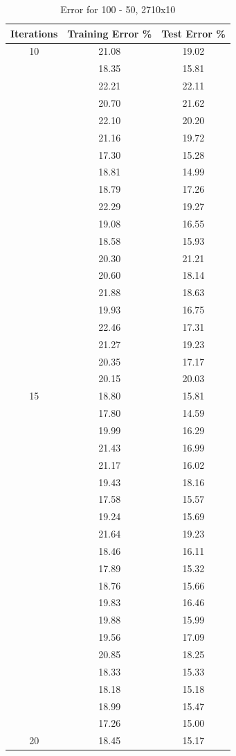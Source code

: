 \documentclass[12pt]{article}
\begin{document}
\begin{table}[h]
	\begin{center}
		\caption{Error for 100 - 50, 2710x10}
		\label{tab:table2}
		\begin{tabular}{|c|c|c|}
			\hline
			\textbf{Iterations} & \textbf{Training Error \%} & \textbf{Test Error \%} \\
			\hline
			10 & 21.08 & 19.02\\
			& 18.35 & 15.81\\
			& 22.21 & 22.11\\
			& 20.70 & 21.62\\
			& 22.10 & 20.20\\
			& 21.16 & 19.72\\
			& 17.30 & 15.28\\
			& 18.81 & 14.99\\
			& 18.79 & 17.26\\
			& 22.29 & 19.27\\
			& 19.08 & 16.55\\
			& 18.58 & 15.93\\
			& 20.30 & 21.21\\
			& 20.60 & 18.14\\
			& 21.88 & 18.63\\
			& 19.93 & 16.75\\
			& 22.46 & 17.31\\
			& 21.27 & 19.23\\
			& 20.35 & 17.17\\
			& 20.15 & 20.03\\
			\hline
			15 & 18.80 & 15.81\\
			& 17.80 & 14.59\\
			& 19.99 & 16.29\\
			& 21.43 & 16.99\\
			& 21.17 & 16.02\\
			& 19.43 & 18.16\\
			& 17.58 & 15.57\\
			& 19.24 & 15.69\\
			& 21.64 & 19.23\\
			& 18.46 & 16.11\\
			& 17.89 & 15.32\\
			& 18.76 & 15.66\\
			& 19.83 & 16.46\\
			& 19.88 & 15.99\\
			& 19.56 & 17.09\\
			& 20.85 & 18.25\\
			& 18.33 & 15.33\\
			& 18.18 & 15.18\\
			& 18.99 & 15.47\\
			& 17.26 & 15.00\\
			\hline
			20 & 18.45 & 15.17 \\
			\hline
		\end{tabular}
	\end{center}
\end{table}
\end{document}
